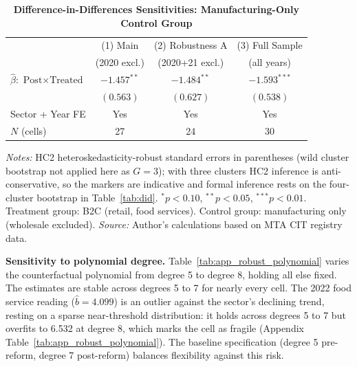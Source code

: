 \documentclass[12pt,oneside,a4paper]{report}
\begin{document}
\begin{table}[H]
\centering
\caption{\textbf{Difference-in-Differences Sensitivities: Manufacturing-Only Control Group}}
\label{tab:app_robust_mfg}
\begin{threeparttable}
\setlength{\tabcolsep}{12pt}
\small
\begin{tabular}{lccc}
\toprule
 & (1) Main & (2) Robustness A & (3) Full Sample \\
 & (2020 excl.) & (2020+21 excl.) & (all years) \\
\midrule
$\hat{\beta}$: $\text{Post} \times \text{Treated}$
  & $-1.457^{**}$ & $-1.484^{**}$ & $-1.593^{***}$ \\
  & $(0.563)$ & $(0.627)$ & $(0.538)$ \\
\midrule
Sector + Year FE & Yes & Yes & Yes \\
$N$ (cells) & 27 & 24 & 30 \\
\bottomrule
\end{tabular}
\begin{tablenotes}\footnotesize
\item \textit{Notes:} HC2 heteroskedasticity-robust standard errors in
parentheses (wild cluster bootstrap not applied here as $G = 3$); with three clusters HC2 inference is anti-conservative, so the markers are indicative and formal inference rests on the four-cluster bootstrap in Table~\ref{tab:did}.
$^{*}p < 0.10$, $^{**}p < 0.05$, $^{***}p < 0.01$.
Treatment group: B2C (retail, food services).
Control group: manufacturing only (wholesale excluded).
\textit{Source:} Author's calculations based on MTA CIT registry data.
\end{tablenotes}
\end{threeparttable}
\end{table}

\vspace{1em}
\noindent\textbf{Sensitivity to polynomial degree.}
Table~\ref{tab:app_robust_polynomial} varies the counterfactual polynomial from degree 5 to degree 8, holding all else fixed. The estimates are stable across degrees 5 to 7 for nearly every cell. The 2022 food service reading ($\hat{b} = 4.099$) is an outlier against the sector's declining trend, resting on a sparse near-threshold distribution: it holds across degrees 5 to 7 but overfits to 6.532 at degree 8, which marks the cell as fragile (Appendix Table~\ref{tab:app_robust_polynomial}). The baseline specification (degree 5 pre-reform, degree 7 post-reform) balances flexibility against this risk.
\end{document}
